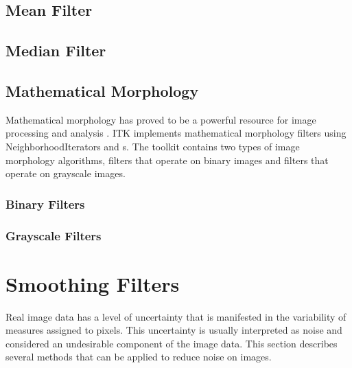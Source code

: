 \subsection{Mean Filter}
\label{sec:MeanFilter}

\ifitkFullVersion

\fi

\subsection{Median Filter}
\label{sec:MedianFilter}

\ifitkFullVersion

\fi


\subsection{Mathematical Morphology}
\label{sec:MathematicalMorphology}

Mathematical morphology has proved to be a powerful resource for image
processing and analysis \cite{Serra1982}. ITK implements mathematical
morphology filters using NeighborhoodIterators and
s.  The toolkit contains two types of image
morphology algorithms, filters that operate on binary images and filters that
operate on grayscale images.

\subsubsection{Binary Filters}
\label{sec:MathematicalMorphologyBinaryFilters}

\ifitkFullVersion

\fi


\subsubsection{Grayscale Filters}
\label{sec:MathematicalMorphologyGrayscaleFilters}

\ifitkFullVersion

\fi




\section{Smoothing Filters}
\label{sec:SmoothingFilters}

Real image data has a level of uncertainty that is manifested in the
variability of measures assigned to pixels. This uncertainty is usually
interpreted as noise and considered an undesirable component of the image
data. This section describes several methods that can be applied to reduce
noise on images.

